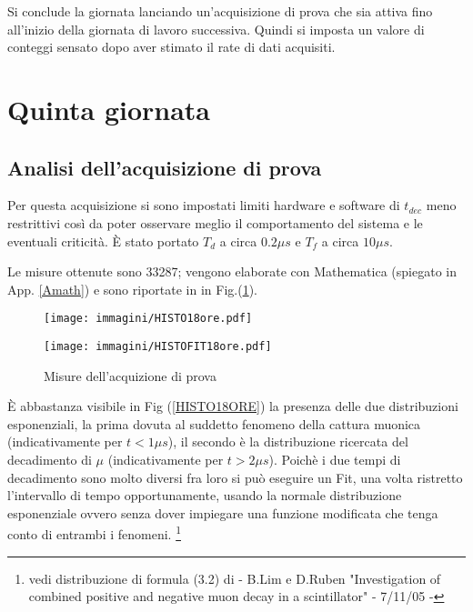 \documentclass[12pt,a4paper,openright,twoside]{article}
\numberwithin{equation}{section} %
\begin{document}
\space

Si conclude la giornata lanciando un'acquisizione di prova che sia attiva fino all'inizio della giornata di lavoro successiva. Quindi si imposta un valore di conteggi sensato dopo aver stimato il rate di dati acquisiti.


\section{Quinta giornata} 

\subsection{Analisi dell'acquisizione di prova}

Per questa acquisizione si sono impostati limiti hardware e software di $t_{dec}$ meno restrittivi così da poter osservare meglio il comportamento del sistema e le eventuali criticità. È stato portato $T_d$ a circa $0.2 \mu s$ e $T_f$ a circa $10 \mu s$.

Le misure ottenute sono 33287; vengono elaborate con Mathematica (spiegato in App. \ref{Amath}) e sono riportate in in Fig.(\ref{istoprova}).

\begin{figure}[htbp]
\begin{center}
\hspace{-18mm}%
\begin{minipage}[c]{.35\textwidth}
\texttt{[image: immagini/HISTO18ore.pdf]}
\label{HISTO18ORE}
\end{minipage}%
\hspace{40mm}%
\vspace{-0mm}
\begin{minipage}[c]{0.45\textwidth}
\texttt{[image: immagini/HISTOFIT18ore.pdf]}
\label{HISTOFIT18ORE}
\end{minipage}
\caption{Misure dell'acquizione di prova\label{istoprova}}
\end{center}
\end{figure}

È abbastanza visibile in Fig (\ref{HISTO18ORE}) la presenza delle due distribuzioni esponenziali, la prima dovuta al suddetto fenomeno della cattura muonica (indicativamente per $t<1 \mu s$), il secondo è la distribuzione ricercata del decadimento di $\mu$ (indicativamente per $t>2\mu s$). Poichè i due tempi di decadimento sono molto diversi fra loro si può eseguire un Fit, una volta ristretto l'intervallo di tempo opportunamente, usando la normale distribuzione esponenziale ovvero senza dover impiegare una funzione modificata che tenga conto di entrambi i fenomeni. \footnote{vedi distribuzione di formula (3.2) di - B.Lim e D.Ruben "Investigation of combined positive and negative muon decay in a scintillator" - 7/11/05 - }  
\end{document}
